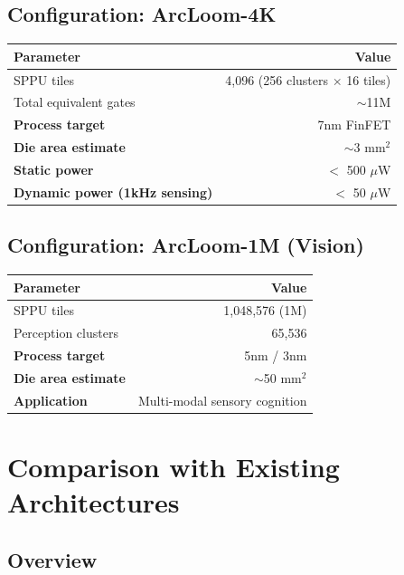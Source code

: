 \documentclass[11pt, a4paper]{article}
\begin{document}
\subsection{Configuration: ArcLoom-4K}

\begin{center}
\begin{tabular}{@{}lr@{}}
\toprule
\textbf{Parameter} & \textbf{Value} \\
\midrule
SPPU tiles & 4,096 (256 clusters $\times$ 16 tiles) \\
Total equivalent gates & $\sim$11M \\
\textbf{Process target} & 7nm FinFET \\
\textbf{Die area estimate} & $\sim$3 mm$^2$ \\
\textbf{Static power} & $<$ 500 $\mu$W \\
\textbf{Dynamic power (1kHz sensing)} & $<$ 50 $\mu$W \\
\bottomrule
\end{tabular}
\end{center}

\subsection{Configuration: ArcLoom-1M (Vision)}

\begin{center}
\begin{tabular}{@{}lr@{}}
\toprule
\textbf{Parameter} & \textbf{Value} \\
\midrule
SPPU tiles & 1,048,576 (1M) \\
Perception clusters & 65,536 \\
\textbf{Process target} & 5nm / 3nm \\
\textbf{Die area estimate} & $\sim$50 mm$^2$ \\
\textbf{Application} & Multi-modal sensory cognition \\
\bottomrule
\end{tabular}
\end{center}

\section{Comparison with Existing Architectures}

\subsection{Overview}
\end{document}

